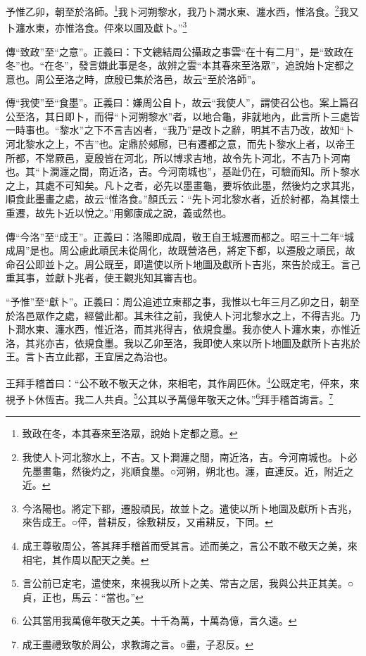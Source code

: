 予惟乙卯，朝至於洛師。\footnote{致政在冬，本其春來至洛眾，說始卜定都之意。}我卜河朔黎水，我乃卜澗水東、瀍水西，惟洛食。\footnote{我使人卜河北黎水上，不吉。又卜澗瀍之間，南近洛，吉。今河南城也。卜必先墨畫龜，然後灼之，兆順食墨。○河朔，朔北也。瀍，直連反。近，附近之近。}我又卜瀍水東，亦惟洛食。伻來以圖及獻卜。”\footnote{今洛陽也。將定下都，遷殷頑民，故並卜之。遣使以所卜地圖及獻所卜吉兆，來告成王。○伻，普耕反，徐敷耕反，又甫耕反，下同。}


{\noindent\zhuan{}\fzbyks 傳“致政”至“之意”。正義曰：下文總結周公攝政之事雲“在十有二月”，是“致政在冬”也。“在冬”，發言嫌此事是冬，故辨之雲“本其春來至洛眾”，追說始卜定都之意也。周公至洛之時，庶殷已集於洛邑，故云“至於洛師”。 \par}

{\noindent\zhuan{}\fzbyks 傳“我使”至“食墨”。正義曰：嫌周公自卜，故云“我使人”，謂使召公也。案上篇召公至洛，其日即卜，而得“卜河朔黎水”者，以地合龜，非就地內，此言所卜三處皆一時事也。“黎水”之下不言吉凶者，“我乃”是改卜之辭，明其不吉乃改，故知“卜河北黎水之上，不吉”也。定鼎於郟鄏，已有遷都之意，而先卜黎水上者，以帝王所都，不常厥邑，夏殷皆在河北，所以博求吉地，故令先卜河北，不吉乃卜河南也。其“卜澗瀍之間，南近洛，吉。今河南城也”，基趾仍在，可驗而知。所卜黎水之上，其處不可知矣。凡卜之者，必先以墨畫龜，要坼依此墨，然後灼之求其兆，順食此墨畫之處，故云“惟洛食。”顏氏云：“先卜河北黎水者，近於紂都，為其懷土重遷，故先卜近以悅之。”用鄭康成之說，義或然也。 \par}

{\noindent\zhuan{}\fzbyks 傳“今洛”至“成王”。正義曰：洛陽即成周，敬王自王城遷而都之。昭三十二年“城成周”是也。周公慮此頑民未從周化，故既營洛邑，將定下都，以遷殷之頑民，故命召公即並卜之。周公既至，即遣使以所卜地圖及獻所卜吉兆，來告於成王。言己重其事，並獻卜兆者，使王觀兆知其審吉也。 \par}

{\noindent\shu{}\fzkt “予惟”至“獻卜”。正義曰：周公追述立東都之事，我惟以七年三月乙卯之日，朝至於洛邑眾作之處，經營此都。其未往之前，我使人卜河北黎水之上，不得吉兆。乃卜澗水東、瀍水西，惟近洛，而其兆得吉，依規食墨。我亦使人卜瀍水東，亦惟近洛，其兆亦吉，依規食墨。我以乙卯至洛，我即使人來以所卜地圖及獻所卜吉兆於王。言卜吉立此都，王宜居之為治也。 \par}

王拜手稽首曰：“公不敢不敬天之休，來相宅，其作周匹休。\footnote{成王尊敬周公，答其拜手稽首而受其言。述而美之，言公不敢不敬天之美，來相宅，其作周以配天之美。}公既定宅，伻來，來視予卜休恆吉。我二人共貞。\footnote{言公前已定宅，遣使來，來視我以所卜之美、常吉之居，我與公共正其美。○貞，正也，馬云：“當也。”}公其以予萬億年敬天之休。”\footnote{公其當用我萬億年敬天之美。十千為萬，十萬為億，言久遠。}拜手稽首誨言。\footnote{成王盡禮致敬於周公，求教誨之言。○盡，子忍反。}



